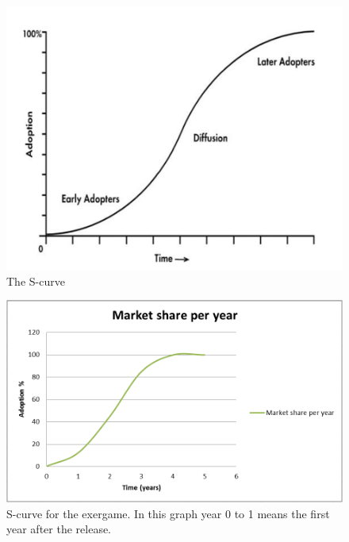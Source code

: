 \begin{figure}
\begin{center}
\includegraphics[scale=0.4]{scurve}
\caption[The S-curve]{The S-curve \cite{scurve}}
\label{fig:scurve}
\end{center}
\end{figure}
\begin{figure}
\begin{center}
\includegraphics[scale=0.5]{scurve2}
\caption[The S-curve]{S-curve for the exergame. In this graph year 0 to 1 means the first year after the release.}
\label{fig:scurve2}
\end{center}
\end{figure}
